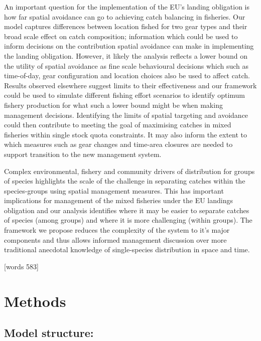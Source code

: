 \documentclass{nature}
\begin{document}
\begin{linenumbers}
An important question for the implementation of the EU's landing obligation is
how far spatial avoidance can go to achieving catch balancing in fisheries.
Our model captures differences between location fished for two gear types and
their broad scale effect on catch composition; information which could be used
to inform decisions on the contribution spatial avoidance can make in
implementing the landing obligation. However, it likely the analysis reflects a
lower bound on the utility of spatial avoidance as fine scale behavioural
decisions which such as time-of-day, gear configuration and location choices
also be used to affect catch\cite{Abbott2015, Thorson2016}. Results observed
elsewhere\cite{Branch2008, Kuriyama2016} suggest limits to their effectiveness
and our framework could be used to simulate different fishing effort scenarios
to identify optimum fishery production\cite{Reimer2017} for what such a lower
bound might be when making management decisions\cite{Ulrich2016}. Identifying
the limits of spatial targeting and avoidance could then contribute to meeting
the goal of maximising catches in mixed fisheries within single stock quota
constraints.  It may also inform the extent to which measures such as  gear
changes and time-area closures are needed to support transition to the new
management system.

Complex environmental, fishery and community drivers of distribution for groups
of species highlights the scale of the challenge in separating catches within
the species-groups using spatial management measures. This has important
implications for management of the mixed fisheries under the EU landings
obligation and our analysis identifies where it may be easier to separate
catches of species (among groups) and where it is more challenging (within
groups). The framework we propose reduces the complexity of the system to it's
major components and thus allows informed management discussion over more
traditional anecdotal knowledge of single-species distribution in space and
time.

[words 583]


\section*{Methods}

\subsection{Model structure:} 


\end{linenumbers}
\end{document}
